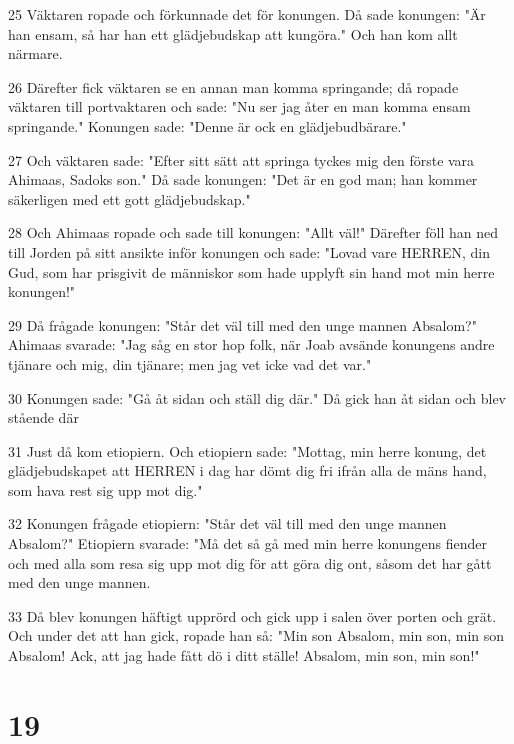 \par 25 Väktaren ropade och förkunnade det för konungen. Då sade konungen: "Är han ensam, så har han ett glädjebudskap att kungöra." Och han kom allt närmare.
\par 26 Därefter fick väktaren se en annan man komma springande; då ropade väktaren till portvaktaren och sade: "Nu ser jag åter en man komma ensam springande." Konungen sade: "Denne är ock en glädjebudbärare."
\par 27 Och väktaren sade: "Efter sitt sätt att springa tyckes mig den förste vara Ahimaas, Sadoks son." Då sade konungen: "Det är en god man; han kommer säkerligen med ett gott glädjebudskap."
\par 28 Och Ahimaas ropade och sade till konungen: "Allt väl!" Därefter föll han ned till Jorden på sitt ansikte inför konungen och sade: "Lovad vare HERREN, din Gud, som har prisgivit de människor som hade upplyft sin hand mot min herre konungen!"
\par 29 Då frågade konungen: "Står det väl till med den unge mannen Absalom?" Ahimaas svarade: "Jag såg en stor hop folk, när Joab avsände konungens andre tjänare och mig, din tjänare; men jag vet icke vad det var."
\par 30 Konungen sade: "Gå åt sidan och ställ dig där." Då gick han åt sidan och blev stående där
\par 31 Just då kom etiopiern. Och etiopiern sade: "Mottag, min herre konung, det glädjebudskapet att HERREN i dag har dömt dig fri ifrån alla de mäns hand, som hava rest sig upp mot dig."
\par 32 Konungen frågade etiopiern: "Står det väl till med den unge mannen Absalom?" Etiopiern svarade: "Må det så gå med min herre konungens fiender och med alla som resa sig upp mot dig för att göra dig ont, såsom det har gått med den unge mannen.
\par 33 Då blev konungen häftigt upprörd och gick upp i salen över porten och grät. Och under det att han gick, ropade han så: "Min son Absalom, min son, min son Absalom! Ack, att jag hade fått dö i ditt ställe! Absalom, min son, min son!"

\chapter{19}

